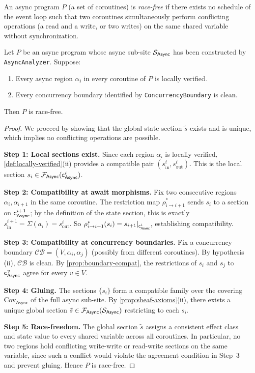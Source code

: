 \documentclass[11pt]{article}
\newcommand{\Async}{\mathsf{Async}}          %
\newcommand{\AwaitMor}[2]{\rho_{#1 \to #2}} %
\newcommand{\CB}{\mathcal{CB}}               %
\newcommand{\asyncSite}{\Site_{\Async}}      %
\newcommand{\asyncCoord}[1]{\coord_{\Async}^{#1}} %
\newcommand{\asyncSheaf}{\mathcal{F}_{\Async}} %
\newcommand{\asyncRegion}[1]{\alpha_{#1}}    %
\newcommand{\stateEnv}{\Sigma}               %
\newcommand{\asyncCov}{\mathrm{Cov}_{\Async}} %
\newcommand{\gluedSec}{\tilde{s}}            %
\begin{document}
\begin{definition}\label{def:race-free}
An async program $P$ (a set of coroutines) is \emph{race-free} if there
exists no schedule of the event loop such that two coroutines simultaneously
perform conflicting operations (a read and a write, or two writes) on the
same shared variable without synchronization.
\end{definition}

\begin{theorem}\label{thm:async-safety}
Let $P$ be an async program whose async sub-site $\asyncSite$ has been
constructed by \texttt{AsyncAnalyzer}.  Suppose:
\begin{enumerate}[label=(\roman*)]
  \item Every async region $\asyncRegion{i}$ in every coroutine of $P$
        is locally verified.
  \item Every concurrency boundary identified by \texttt{ConcurrencyBoundary}
        is clean.
\end{enumerate}
Then $P$ is race-free.
\end{theorem}
\begin{proof}
We proceed by showing that the global state section $\gluedSec$ exists and
is unique, which implies no conflicting operations are possible.

\textbf{Step 1: Local sections exist.}  Since each region $\asyncRegion{i}$
is locally verified, \cref{def:locally-verified}(ii) provides a compatible
pair $(s_{\mathrm{in}}^i, s_{\mathrm{out}}^i)$.  This is the local section
$s_i \in \asyncSheaf(\asyncCoord{i})$.

\textbf{Step 2: Compatibility at await morphisms.}  Fix two consecutive
regions $\asyncRegion{i}, \asyncRegion{i+1}$ in the same coroutine.
The restriction map $\AwaitMor{i}{i+1}^*$ sends $s_i$ to a section on
$\asyncCoord{i+1}$; by the definition of the state section, this is
exactly $s_{\mathrm{in}}^{i+1} = \stateEnv(a_i) = s_{\mathrm{out}}^i$.
So $\AwaitMor{i}{i+1}^*(s_i) = s_{i+1}|_{\asyncCoord{i}}$, establishing
compatibility.

\textbf{Step 3: Compatibility at concurrency boundaries.}  Fix a concurrency
boundary $\CB = (V, \asyncRegion{i}, \asyncRegion{j})$ (possibly from
different coroutines).  By hypothesis (ii), $\CB$ is clean.  By
\cref{prop:boundary-compat}, the restrictions of $s_i$ and $s_j$ to
$\asyncCoord{v}$ agree for every $v \in V$.

\textbf{Step 4: Gluing.}  The sections $\{s_i\}$ form a compatible family
over the covering $\asyncCov$ of the full async sub-site.  By
\cref{prop:sheaf-axioms}(ii), there exists a unique global section
$\gluedSec \in \asyncSheaf(\asyncSite)$ restricting to each $s_i$.

\textbf{Step 5: Race-freedom.}  The global section $\gluedSec$ assigns a
consistent effect class and state value to every shared variable across all
coroutines.  In particular, no two regions hold conflicting write-write or
read-write sections on the same variable, since such a conflict would violate
the agreement condition in Step~3 and prevent gluing.  Hence $P$ is
race-free.
\end{proof}
\end{document}
